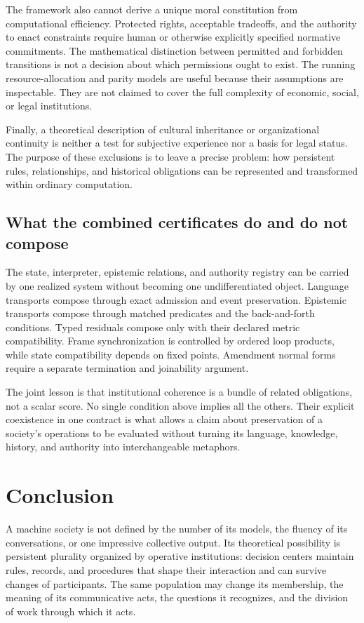 \documentclass[11pt,letterpaper]{article}
\theoremstyle{plain}
\theoremstyle{definition}
\theoremstyle{remark}
\begin{document}
The framework also cannot derive a unique moral constitution from computational efficiency. Protected rights, acceptable tradeoffs, and the authority to enact constraints require human or otherwise explicitly specified normative commitments. The mathematical distinction between permitted and forbidden transitions is not a decision about which permissions ought to exist. The running resource-allocation and parity models are useful because their assumptions are inspectable. They are not claimed to cover the full complexity of economic, social, or legal institutions.

Finally, a theoretical description of cultural inheritance or organizational continuity is neither a test for subjective experience nor a basis for legal status. The purpose of these exclusions is to leave a precise problem: how persistent rules, relationships, and historical obligations can be represented and transformed within ordinary computation.

\subsection{What the combined certificates do and do not compose}
The state, interpreter, epistemic relations, and authority registry can be carried by one realized system without becoming one undifferentiated object. Language transports compose through exact admission and event preservation. Epistemic transports compose through matched predicates and the back-and-forth conditions. Typed residuals compose only with their declared metric compatibility. Frame synchronization is controlled by ordered loop products, while state compatibility depends on fixed points. Amendment normal forms require a separate termination and joinability argument.

The joint lesson is that institutional coherence is a bundle of related obligations, not a scalar score. No single condition above implies all the others. Their explicit coexistence in one contract is what allows a claim about preservation of a society's operations to be evaluated without turning its language, knowledge, history, and authority into interchangeable metaphors.

\section{Conclusion}\label{sec:conclusion}
A machine society is not defined by the number of its models, the fluency of its conversations, or one impressive collective output. Its theoretical possibility is persistent plurality organized by operative institutions: decision centers maintain rules, records, and procedures that shape their interaction and can survive changes of participants. The same population may change its membership, the meaning of its communicative acts, the questions it recognizes, and the division of work through which it acts.
\end{document}
